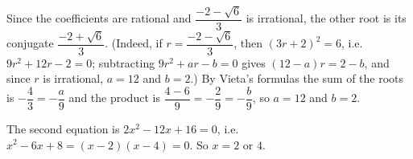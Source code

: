 Since the coefficients are rational and $\dfrac{-2-\sqrt6}{3}$ is irrational, the other root is its conjugate $\dfrac{-2+\sqrt6}{3}$. (Indeed, if $r=\dfrac{-2-\sqrt6}{3}$, then $(3r+2)^2=6$, i.e.\ $9r^2+12r-2=0$; subtracting $9r^2+ar-b=0$ gives $(12-a)r=2-b$, and since $r$ is irrational, $a=12$ and $b=2$.) By Vieta's formulas the sum of the roots is $-\dfrac{4}{3}=-\dfrac {a}{9}$ and the product is $\dfrac{4-6}{9}=-\dfrac{2}{9}=-\dfrac {b}{9}$, so $a=12$ and $b=2$.

The second equation is $2x^2-12x+16=0$, i.e.\ $x^2-6x+8=(x-2)(x-4)=0$. So $x=\boxed{2\text{ or }4}$.
